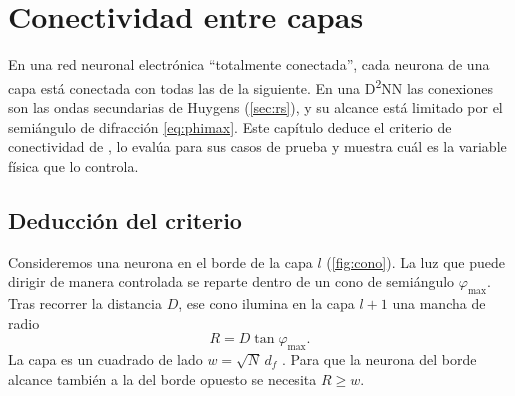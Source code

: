 \chapter{Conectividad entre capas}\label{cap:conectividad}

En una red neuronal electrónica ``totalmente conectada'', cada neurona de una capa está
conectada con todas las de la siguiente. En una D\textsuperscript{2}NN las conexiones son las
ondas secundarias de Huygens (\cref{sec:rs}), y su alcance está limitado por el semiángulo de
difracción \eqref{eq:phimax}. Este capítulo deduce el criterio de conectividad de
\textcite{chen2021}, lo evalúa para sus casos de prueba y muestra cuál es la variable física
que lo controla.

\section{Deducción del criterio}\label{sec:criterio}

Consideremos una neurona en el borde de la capa $l$ (\cref{fig:cono}). La luz que puede
dirigir de manera controlada se reparte dentro de un cono de semiángulo $\varphi_{\max}$. Tras
recorrer la distancia $D$, ese cono ilumina en la capa $l+1$ una mancha de radio
\parencite[Ec.~7]{chen2021}
\begin{equation}
  R=D\tan\varphi_{\max}.
  \label{eq:radio}
\end{equation}
La capa es un cuadrado de lado $w=\sqrt N\,d_f$ \parencite[Ec.~8]{chen2021}. Para que la
neurona del borde alcance también a la del borde opuesto se necesita $R\ge w$.

